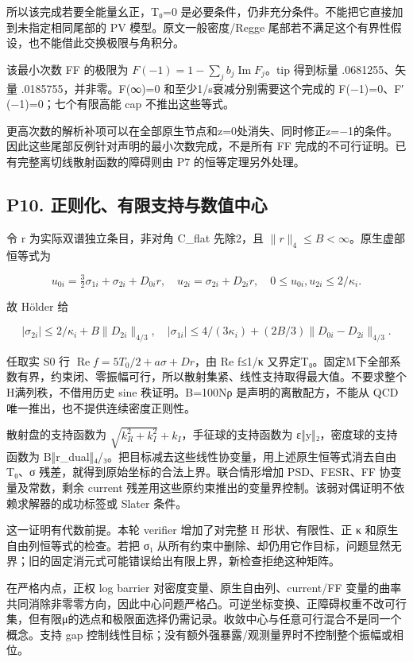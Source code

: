\documentclass[
  11pt,
  a4paper,
]{article}
\begin{document}
所以该完成若要全能量幺正，T₀=0
是必要条件，仍非充分条件。不能把它直接加到未指定相同尾部的 PV
模型。原文一般密度/Regge
尾部若不满足这个有界性假设，也不能借此交换极限与角积分。

该最小次数 FF 的极限为 \(F(-1)=1-\sum_jb_j\operatorname{Im}F_j\)。tip
得到标量 .0681255、矢量 .0185755，并非零。F(∞)=0
和至少1/s衰减分别需要这个完成的 F(−1)=0、F′(−1)=0；七个有限高能 cap
不推出这些等式。

更高次数的解析补项可以在全部原生节点和z=0处消失、同时修正z=−1的条件。因此这些尾部反例针对声明的最小次数完成，不是所有
FF 完成的不可行证明。已有完整离切线散射函数的障碍则由 P7
的恒等定理另外处理。

\subsection{P10.
正则化、有限支持与数值中心}\label{p10.-ux6b63ux5219ux5316ux6709ux9650ux652fux6301ux4e0eux6570ux503cux4e2dux5fc3}

令 r 为实际双谱独立条目，非对角 C\_flat 先除2，且
\(\lVert r\rVert_4\le B<\infty\)。原生虚部恒等式为

\[
u_{0i}=\tfrac32\sigma_{1i}+\sigma_{2i}+D_{0i}r,\quad
u_{2i}=\sigma_{2i}+D_{2i}r,
\quad0\le u_{0i},u_{2i}\le2/\kappa_i.
\]

故 Hölder 给

\[
|\sigma_{2i}|\le2/\kappa_i+B\|D_{2i}\|_{4/3},\quad
|\sigma_{1i}|\le4/(3\kappa_i)+(2B/3)\|D_{0i}-D_{2i}\|_{4/3}.
\]

任取实 S0 行 \(\operatorname{Re}f=5T_0/2+a\sigma+Dr\)，由 \textbar Re
f\textbar≤1/κ
又界定T₀。固定M下全部系数有界，约束闭、零振幅可行，所以散射集紧、线性支持取得最大值。不要求整个H满列秩，不借用历史
sine 秩证明。B=100Nρ 是声明的离散配方，不能从 QCD
唯一推出，也不提供连续密度正则性。

散射盘的支持函数为 \(\sqrt{k_R^2+k_I^2}+k_I\)，手征球的支持函数为
ε‖y‖₂，密度球的支持函数为
B‖r\_dual‖₄/₃。把目标减去这些线性协变量，用上述原生恒等式消去自由 T₀、σ
残差，就得到原始坐标的合法上界。联合情形增加 PSD、FESR、FF
协变量及常数，剩余 current
残差用这些原约束推出的变量界控制。该弱对偶证明不依赖求解器的成功标签或
Slater 条件。

这一证明有代数前提。本轮 verifier 增加了对完整 H 形状、有限性、正 κ
和原生自由列恒等式的检查。若把 σ₁
从所有约束中删除、却仍用它作目标，问题显然无界；旧的固定消元式可能错误给出有限上界，新检查拒绝这种矩阵。

在严格内点，正权 log barrier 对密度变量、原生自由列、current/FF
变量的曲率共同消除非零零方向，因此中心问题严格凸。可逆坐标变换、正障碍权重不改可行集，但有限μ的选点和极限面选择仍需记录。收敛中心与任意可行混合不是同一个概念。支持
gap 控制线性目标；没有额外强暴露/观测量界时不控制整个振幅或相位。
\end{document}
